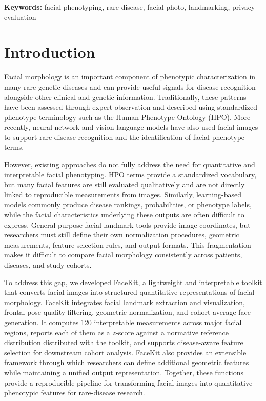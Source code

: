 \documentclass[11pt]{article}
\begin{document}
\noindent\textbf{Keywords:} facial phenotyping, rare disease, facial photo, landmarking, privacy evaluation

\section{Introduction}
Facial morphology is an important component of phenotypic characterization in many rare genetic diseases and can provide useful signals for disease recognition alongside other clinical and genetic information. Traditionally, these patterns have been assessed through expert observation and described using standardized phenotype terminology such as the Human Phenotype Ontology (HPO). More recently, neural-network \cite{DeepGestalt,hsieh2022gestaltmatcher} and vision-language models \cite{mint, gestaltmml} have also used facial images to support rare-disease recognition and the identification of facial phenotype terms.

However, existing approaches do not fully address the need for quantitative and interpretable facial phenotyping. HPO terms provide a standardized vocabulary, but many facial features are still evaluated qualitatively and are not directly linked to reproducible measurements from images. Similarly, learning-based models commonly produce disease rankings, probabilities, or phenotype labels, while the facial characteristics underlying these outputs are often difficult to express. General-purpose facial landmark tools provide image coordinates, but researchers must still define their own normalization procedures, geometric measurements, feature-selection rules, and output formats. This fragmentation makes it difficult to compare facial morphology consistently across patients, diseases, and study cohorts.

To address this gap, we developed FaceKit, a lightweight and interpretable toolkit that converts facial images into structured quantitative representations of facial morphology. FaceKit integrates facial landmark extraction and visualization, frontal-pose quality filtering, geometric normalization, and cohort average-face generation. It computes 120 interpretable measurements across major facial regions, reports each of them as a $z$-score against a normative reference distribution distributed with the toolkit, and supports disease-aware feature selection for downstream cohort analysis. FaceKit also provides an extensible framework through which researchers can define additional geometric features while maintaining a unified output representation. Together, these functions provide a reproducible pipeline for transforming facial images into quantitative phenotypic features for rare-disease research.
\end{document}
